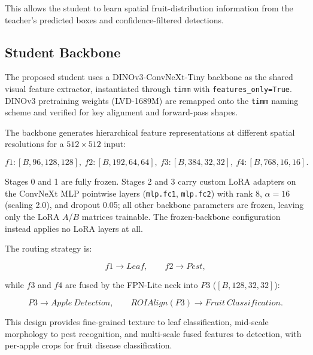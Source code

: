 \documentclass[preprint,12pt]{elsarticle}
\begin{document}
This allows the student to learn spatial fruit-distribution information
from the teacher's predicted boxes and confidence-filtered detections.


\subsection{Student Backbone}

The proposed student uses a DINOv3-ConvNeXt-Tiny backbone as the shared
visual feature extractor, instantiated through \texttt{timm} with
\texttt{features\_only=True}. DINOv3 pretraining weights
(LVD-1689M) are remapped onto the \texttt{timm} naming scheme and
verified for key alignment and forward-pass shapes.

The backbone generates hierarchical feature representations at
different spatial resolutions for a $512\times512$ input:

\begin{equation}
f1:[B,96,128,128],\
f2:[B,192,64,64],\
f3:[B,384,32,32],\
f4:[B,768,16,16].
\end{equation}

Stages 0 and 1 are fully frozen. Stages 2 and 3 carry custom LoRA
adapters on the ConvNeXt MLP pointwise layers (\texttt{mlp.fc1},
\texttt{mlp.fc2}) with rank 8, $\alpha=16$ (scaling 2.0), and dropout
0.05; all other backbone parameters are frozen, leaving only the LoRA
$A$/$B$ matrices trainable. The frozen-backbone configuration instead
applies no LoRA layers at all.

The routing strategy is:

\begin{equation}
f1\rightarrow Leaf,
\qquad
f2\rightarrow Pest,
\end{equation}

while $f3$ and $f4$ are fused by the FPN-Lite neck into $P3$
($[B,128,32,32]$):

\begin{equation}
P3\rightarrow Apple\ Detection,
\qquad
ROIAlign(P3)\rightarrow Fruit\ Classification.
\end{equation}

This design provides fine-grained texture to leaf classification,
mid-scale morphology to pest recognition, and multi-scale fused features
to detection, with per-apple crops for fruit disease classification.
\end{document}
